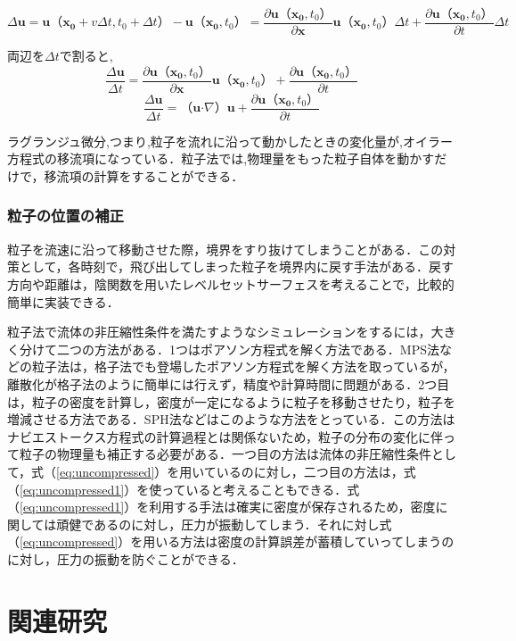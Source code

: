 \documentclass[a4j,12pt]{jreport}
\begin{document}
$$ \varDelta \bm{u} = \bm{u}（\bm{x_0}+v\varDelta t,t_0+\varDelta t） - \bm{u}（\bm{x_0},t_0） = \frac{\partial \bm{u}（\bm{x_0},t_0）}{\partial \bm{x}}\bm{u}（\bm{x_0},t_0）\varDelta t + \frac{\partial \bm{u}（\bm{x_0},t_0）}{\partial t}\varDelta t$$

両辺を$\varDelta t$で割ると,
$$ \frac{\varDelta \bm{u}}{\varDelta t} = \frac{\partial \bm{u}（\bm{x_0},t_0）}{\partial \bm{x}}\bm{u}（\bm{x_0},t_0） + \frac{\partial \bm{u}（\bm{x_0},t_0）}{\partial t}$$
$$ \frac{\varDelta \bm{u}}{\varDelta t} = （\bm{u}\boldsymbol{\cdot}\nabla）\bm{u} + \frac{\partial \bm{u}（\bm{x_0},t_0）}{\partial t}$$

ラグランジュ微分,つまり,粒子を流れに沿って動かしたときの変化量が,オイラー方程式の移流項になっている．粒子法では,物理量をもった粒子自体を動かすだけで，移流項の計算をすることができる．

\subsubsection{粒子の位置の補正} \label{subsec:fixparticlepos}
粒子を流速に沿って移動させた際，境界をすり抜けてしまうことがある．この対策として，各時刻で，飛び出してしまった粒子を境界内に戻す手法がある．戻す方向や距離は，陰関数を用いたレベルセットサーフェスを考えることで，比較的簡単に実装できる．

粒子法で流体の非圧縮性条件を満たすようなシミュレーションをするには，大きく分けて二つの方法がある．1つはポアソン方程式を解く方法である．MPS法などの粒子法は，格子法でも登場したポアソン方程式を解く方法を取っているが，離散化が格子法のように簡単には行えず，精度や計算時間に問題がある．2つ目は，粒子の密度を計算し，密度が一定になるように粒子を移動させたり，粒子を増減させる方法である．SPH法などはこのような方法をとっている．この方法はナビエストークス方程式の計算過程とは関係ないため，粒子の分布の変化に伴って粒子の物理量も補正する必要がある．一つ目の方法は流体の非圧縮性条件として，式（\ref{eq:uncompressed}）を用いているのに対し，二つ目の方法は，式（\ref{eq:uncompressed1}）を使っていると考えることもできる．式（\ref{eq:uncompressed1}）を利用する手法は確実に密度が保存されるため，密度に関しては頑健であるのに対し，圧力が振動してしまう．それに対し式（\ref{eq:uncompressed}）を用いる方法は密度の計算誤差が蓄積していってしまうのに対し，圧力の振動を防ぐことができる．

\section{関連研究} \label{sec:reratedworks}
\end{document}

